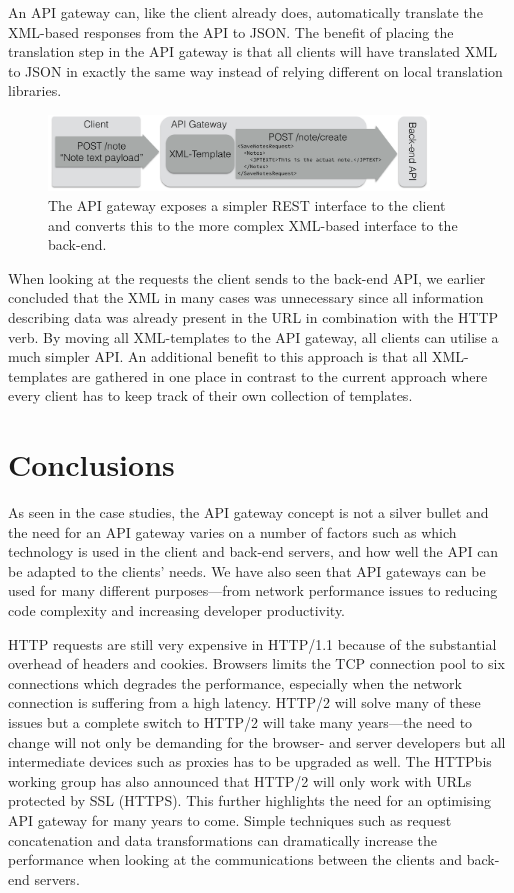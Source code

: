 \documentclass{cslthse-msc}
\begin{document}
An API gateway can, like the client already does, automatically translate the XML-based responses from the API to JSON. The benefit of placing the translation step in the API gateway is that all clients will have translated XML to JSON in exactly the same way instead of relying different on local translation libraries.

\begin{figure}[H]
  \centering
    \begin{center}
      \includegraphics[width=0.9\textwidth]{images/api_gateway_xml.png}
    \end{center}
  \caption{The API gateway exposes a simpler REST interface to the client and converts this to the more complex XML-based interface to the back-end.}
\end{figure}

When looking at the requests the client sends to the back-end API, we earlier concluded that the XML in many cases was unnecessary since all information describing data was already present in the URL in combination with the HTTP verb. By moving all XML-templates to the API gateway, all clients can utilise a much simpler API. An additional benefit to this approach is that all XML-templates are gathered in one place in contrast to the current approach where every client has to keep track of their own collection of templates.

\chapter{Conclusions}
As seen in the case studies, the API gateway concept is not a silver bullet and the need for an API gateway varies on a number of factors such as which technology is used in the client and back-end servers, and how well the API can be adapted to the clients' needs. We have also seen that API gateways can be used for many different purposes---from network performance issues to reducing code complexity and increasing developer productivity.

HTTP requests are still very expensive in HTTP/1.1 because of the substantial overhead of headers and cookies. Browsers limits the TCP connection pool to six connections which degrades the performance, especially when the network connection is suffering from a high latency. HTTP/2 will solve many of these issues but a complete switch to HTTP/2 will take many years---the need to change will not only be demanding for the browser- and server developers but all intermediate devices such as proxies has to be upgraded as well. The HTTPbis working group has also announced that HTTP/2 will only work with URLs protected by SSL (HTTPS)\cite{http2_ssl}. This further highlights the need for an optimising API gateway for many years to come. Simple techniques such as request concatenation and data transformations can dramatically increase the performance when looking at the communications between the clients and back-end servers.
\end{document}
